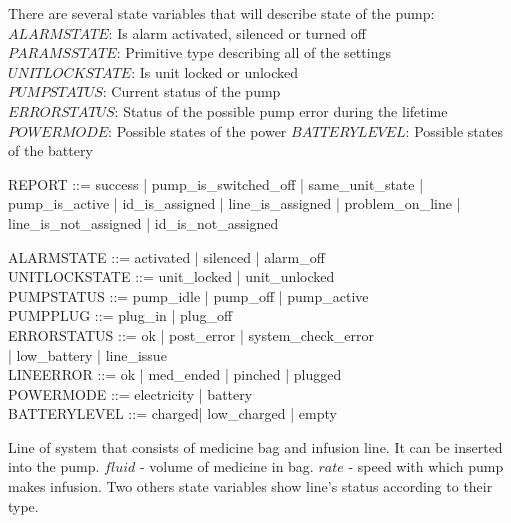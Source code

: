 \documentclass{article}
\begin{document}
	
	There are several state variables that will describe state of the pump:\\
	
	
	$ALARMSTATE$: Is alarm activated, silenced or turned off\\
	$PARAMSSTATE$: Primitive type describing all of the settings\\
	$UNITLOCKSTATE$: Is unit locked or unlocked \\
	$PUMPSTATUS$: Current status of the pump\\
	$ERRORSTATUS$: Status of the possible pump error during the lifetime\\
	$POWERMODE$: Possible states of the power
	$BATTERYLEVEL$: Possible states of the battery 
	
	\begin{zed}	
		[PARAMSSTATE] 
		
		REPORT ::= success | pump\_is\_switched_off | same\_unit_state | pump\_is\_active | id\_is\_assigned | line\_is\_assigned | problem\_on\_line | line\_is\_not\_assigned | id\_is\_not\_assigned
		
		ALARMSTATE ::= activated | silenced | alarm\_off \\
		
	
		UNITLOCKSTATE ::= unit\_locked | unit\_unlocked \\
	
		PUMPSTATUS ::= pump\_idle | pump\_off | pump\_active \\
		
		PUMPPLUG ::=  plug\_in | plug\_off\\
		
		ERRORSTATUS ::= ok |  post\_error | system\_check\_error \\ |  low\_battery | line\_issue \\
		
		LINEERROR ::= ok | med\_ended | pinched | plugged \\
		
		POWERMODE ::= electricity | battery  \\
		
		BATTERYLEVEL ::= charged| low\_charged | empty\\
	
	\end{zed}
	
	
	Line of system that consists of medicine bag and infusion line. It can be inserted into the pump. $fluid$ - volume of medicine in bag. $rate$ - speed with which pump makes infusion. Two others state variables show line's status according to their type.
	
\end{document}
